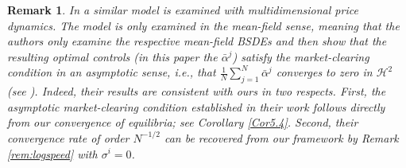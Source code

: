 \documentclass[10pt,a4paper]{article}
\theoremstyle{plain}
\newtheorem{Remark}[Theorem]{Remark}
\theoremstyle{definition}
\numberwithin{equation}{section}
\begin{document}
\begin{Remark}
In \cite{RefN10} a similar model is examined with multidimensional price dynamics. The model is only examined in the mean-field sense, meaning that the authors only examine the respective mean-field BSDEs and then show that the resulting optimal controls (in this paper the $\bar{\alpha}^{j}$) satisfy the market-clearing condition in an asymptotic sense, i.e., that $\tfrac{1}{N}\sum_{j=1}^{N}\bar{\alpha}^{j}$ converges to zero in $\mathcal{H}^{2}$ (see \cite[Theorem 5.1]{RefN10}). 
Indeed, their results are consistent with ours in two respects. First, the asymptotic market-clearing condition established in their work follows directly from our convergence of equilibria; see Corollary \ref{Cor5.4}. Second, their convergence rate of order \(N^{-1/2}\) can be recovered from our framework by Remark \ref{rem:logspeed} with \(\sigma^i=0\).

\end{Remark}


\end{document}
